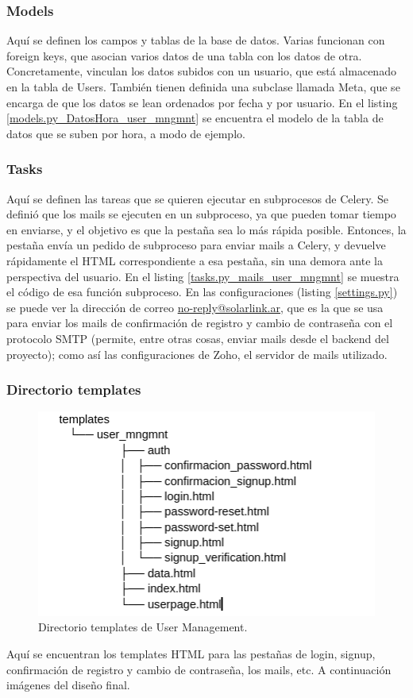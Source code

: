 \subsubsection{Models}

Aquí se definen los campos y tablas de la base de datos. Varias funcionan con foreign keys, que asocian varios datos de una tabla con los datos de otra. Concretamente, vinculan los datos subidos con un usuario, que está almacenado en la tabla de Users. También tienen definida una subclase llamada Meta, que se encarga de que los datos se lean ordenados por fecha y por usuario. En el listing \ref{models.py_DatosHora_user_mngmnt} se encuentra el modelo de la tabla de datos que se suben por hora, a modo de ejemplo. 

\subsubsection{Tasks}

Aquí se definen las tareas que se quieren ejecutar en subprocesos de Celery. Se definió que los mails se ejecuten en un subproceso, ya que pueden tomar tiempo en enviarse, y el objetivo es que la pestaña sea lo más rápida posible. Entonces, la pestaña envía un pedido de subproceso para enviar mails a Celery, y devuelve rápidamente el HTML correspondiente a esa pestaña, sin una demora ante la perspectiva del usuario. En el listing \ref{tasks.py_mails_user_mngmnt} se muestra el código de esa función subproceso. En las configuraciones (listing \ref{settings.py}) se puede ver la dirección de correo \href{no-reply@solarlink.ar}{no-reply@solarlink.ar}, que es la que se usa para enviar los mails de confirmación de registro y cambio de contraseña con el protocolo SMTP (permite, entre otras cosas, enviar mails desde el backend del proyecto); como así las configuraciones de Zoho, el servidor de mails utilizado.

\subsubsection{Directorio templates}
\begin{figure}[H]
    \centering
    \includegraphics[width=0.7\linewidth]{web/Captura desde 2023-10-17 00-12-42.png}
    \caption{Directorio templates de User Management.}
    \label{fig:dir-templates_user_mngmnt}
\end{figure}
Aquí se encuentran los templates HTML para las pestañas de login, signup, confirmación de registro y cambio de contraseña, los mails, etc. A continuación imágenes del diseño final.


